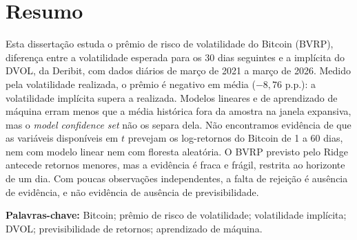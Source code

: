 \chapter*{Resumo}

Esta dissertação estuda o prêmio de risco de volatilidade do Bitcoin (BVRP),
diferença entre a volatilidade esperada para os 30 dias seguintes e a implícita
do DVOL, da Deribit, com dados diários de março de 2021 a março de 2026.
Medido pela volatilidade realizada, o prêmio é negativo em média
($-8{,}76$ p.p.): a volatilidade implícita supera a realizada. Modelos lineares e de aprendizado de máquina erram menos
que a média histórica fora da amostra na janela expansiva, mas o
\textit{model confidence set} não os separa dela. Não encontramos evidência de
que as variáveis disponíveis em $t$ prevejam os log-retornos do Bitcoin de 1 a
60 dias, nem com modelo linear nem com floresta aleatória. O
BVRP previsto pelo Ridge antecede retornos menores, mas a evidência é fraca e
frágil, restrita ao horizonte de um dia. Com poucas observações independentes,
a falta de rejeição é ausência de evidência, e não evidência de ausência de
previsibilidade.

\vspace{0.5cm}
\noindent\textbf{Palavras-chave:} Bitcoin; prêmio de risco de volatilidade; volatilidade implícita; DVOL; previsibilidade de retornos; aprendizado de máquina.
